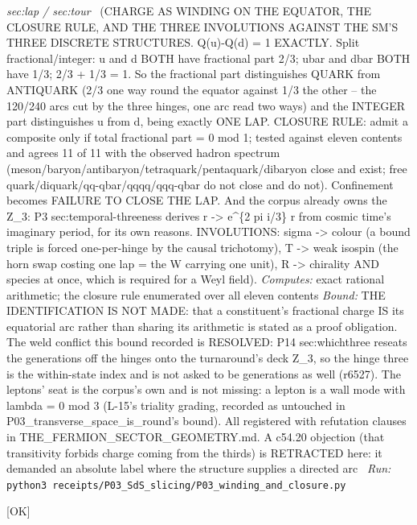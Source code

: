 \begin{description}
\textit{sec:lap / sec:tour} \ (CHARGE AS WINDING ON THE EQUATOR, THE CLOSURE RULE, AND THE THREE INVOLUTIONS AGAINST THE SM'S THREE DISCRETE STRUCTURES. Q(u)-Q(d) = 1 EXACTLY. Split fractional/integer: u and d BOTH have fractional part 2/3; ubar and dbar BOTH have 1/3; 2/3 + 1/3 = 1. So the fractional part distinguishes QUARK from ANTIQUARK (2/3 one way round the equator against 1/3 the other -- the 120/240 arcs cut by the three hinges, one arc read two ways) and the INTEGER part distinguishes u from d, being exactly ONE LAP. CLOSURE RULE: admit a composite only if total fractional part = 0 mod 1; tested against eleven contents and agrees 11 of 11 with the observed hadron spectrum (meson/baryon/antibaryon/tetraquark/pentaquark/dibaryon close and exist; free quark/diquark/qq-qbar/qqqq/qqq-qbar do not close and do not). Confinement becomes FAILURE TO CLOSE THE LAP. And the corpus already owns the Z\_3: P3 sec:temporal-threeness derives r -> e\textasciicircum{}\{2 pi i/3\} r from cosmic time's imaginary period, for its own reasons. INVOLUTIONS: sigma -> colour (a bound triple is forced one-per-hinge by the causal trichotomy), T -> weak isospin (the horn swap costing one lap = the W carrying one unit), R -> chirality AND species at once, which is required for a Weyl field). 
\emph{Computes:} exact rational arithmetic; the closure rule enumerated over all eleven contents
 \emph{Bound:} THE IDENTIFICATION IS NOT MADE: that a constituent's fractional charge IS its equatorial arc rather than sharing its arithmetic is stated as a proof obligation. The weld conflict this bound recorded is RESOLVED: P14 sec:whichthree reseats the generations off the hinges onto the turnaround's deck Z\_3, so the hinge three is the within-state index and is not asked to be generations as well (r6527). The leptons' seat is the corpus's own and is not missing: a lepton is a wall mode with lambda = 0 mod 3 (L-15's triality grading, recorded as untouched in P03\_transverse\_space\_is\_round's bound). All registered with refutation clauses in THE\_FERMION\_SECTOR\_GEOMETRY.md. A c54.20 objection (that transitivity forbids charge coming from the thirds) is RETRACTED here: it demanded an absolute label where the structure supplies a directed arc
\ \emph{Run:} \texttt{python3 receipts/P03\_SdS\_slicing/P03\_winding\_and\_closure.py}
\item[\rcptlabel{P03_twelve_null_legs}{P3R51}\textbf{P3R51}\quad\texttt{P03\_twelve\_null\_legs}]\hfill\textsf{[OK]}\\

\end{description}
